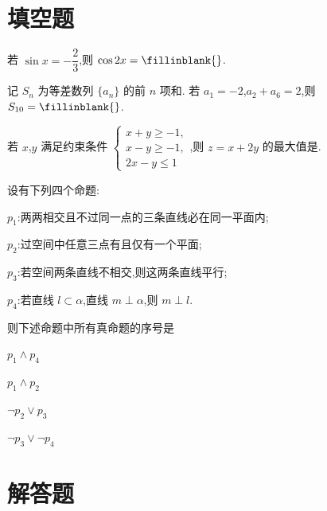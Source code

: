 \section{填空题}

\begin{problem}
若 \(\sin x=-\dfrac{2}{3}\),则 \(\cos 2x=\fillinblank{}\).
\end{problem}

\begin{problem}
记 \(S_n\) 为等差数列 \(\{a_n\}\) 的前 \(n\) 项和. 若 \(a_1=-2\),\(a_2+a_6=2\),则 \(S_{10}=\fillinblank{}\).
\end{problem}

\begin{problem}
若 \(x\),\(y\) 满足约束条件
\(\begin{cases}
x+y\ge -1,\\
x-y\ge -1,\\
2x-y\le 1
\end{cases}\),则 \(z=x+2y\) 的最大值是\fillinblank{}.
\end{problem}

\begin{problem}
设有下列四个命题:

\begin{circlelist}
\item \(p_1\):两两相交且不过同一点的三条直线必在同一平面内;
\item \(p_2\):过空间中任意三点有且仅有一个平面;
\item \(p_3\):若空间两条直线不相交,则这两条直线平行;
\item \(p_4\):若直线 \(l\subset \alpha\),直线 \(m\perp \alpha\),则 \(m\perp l\).
\end{circlelist}

则下述命题中所有真命题的序号是\fillinblank{}

\begin{circlelist}
    \item \(p_1\land p_4\)
    \item \(p_1\land p_2\)
    \item \(\neg p_2\vee p_3\)
    \item \(\neg p_3\vee \neg p_4\)
\end{circlelist}
\end{problem}

\section{解答题}


